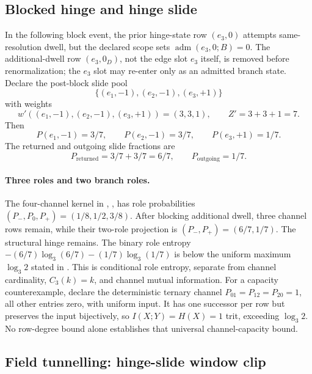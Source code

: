\subsection{Blocked hinge and hinge slide}\label{manual:dec-ledger:hinge-slide}
In the following block event, the prior hinge-state row \((e_3,0)\) attempts same-resolution dwell, but the declared scope sets \(\operatorname{adm}(e_3,0;B)=0\). The additional-dwell row \((e_3,0_D)\), not the edge slot \(e_3\) itself, is removed before renormalization; the \(e_3\) slot may re-enter only as an admitted branch state. Declare the post-block slide pool
\[
\{(e_1,-1),(e_2,-1),(e_3,+1)\}
\]
with weights
\[
w'((e_1,-1),(e_2,-1),(e_3,+1))=(3,3,1),
\qquad
Z'=3+3+1=7.
\]
Then
\[
P(e_1,-1)=3/7,
\qquad
P(e_2,-1)=3/7,
\qquad
P(e_3,+1)=1/7.
\]
The returned and outgoing slide fractions are
\[
P_{\mathrm{returned}}=3/7+3/7=6/7,
\qquad
P_{\mathrm{outgoing}}=1/7.
\]

\paragraph{Three roles and two branch roles.}
The four-channel kernel in ,
, has role probabilities
\((P_-,P_0,P_+)=(1/8,1/2,3/8)\). After blocking additional dwell,
three channel rows remain, while their two-role projection is
\((P_-,P_+)=(6/7,1/7)\). The structural hinge remains. The binary role entropy
\(-(6/7)\log_3(6/7)-(1/7)\log_3(1/7)\) is below the uniform maximum
\(\log_3 2\) stated in .
This is conditional role entropy, separate from channel cardinality,
\(C_3(k)=k\), and channel mutual information.
For a capacity counterexample, declare the deterministic ternary channel
\(P_{01}=P_{12}=P_{20}=1\), all other entries zero, with uniform input.
It has one successor per row but preserves the input bijectively, so
\(I(X;Y)=H(X)=1\) trit, exceeding \(\log_3 2\).
No row-degree bound alone establishes that universal channel-capacity bound.

\subsection{Field tunnelling: hinge-slide window clip}\label{manual:dec-ledger:field-tunnelling}


